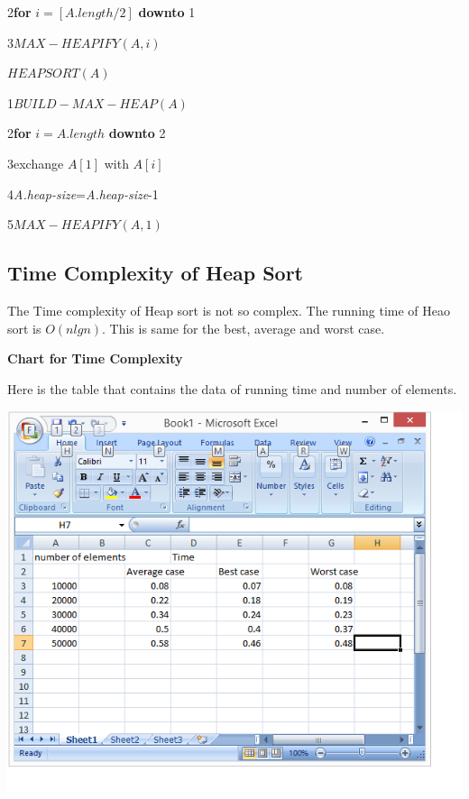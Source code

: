 \documentclass[12 pt,a4paper]{report}
\begin{document}
2\hspace{0.5cm}\textbf{for} $i=[A.length/2]$ \textbf{downto} 1

3\hspace{1cm}$MAX-HEAPIFY(A,i)$

\vspace{1cm}

$HEAPSORT(A)$

1\hspace{0.5cm}$BUILD-MAX-HEAP(A)$

2\hspace{0.5cm}\textbf{for} $i=A.length$ \textbf{downto} 2

3\hspace{1cm}exchange $A[1]$ with $A[i]$

4\hspace{1cm}\textit{A.heap-size}=\textit{A.heap-size}-1

5\hspace{1cm}$MAX-HEAPIFY(A,1)$

\subsection{Time Complexity of Heap Sort}

The Time complexity of Heap sort is not so complex. The running time of Heao sort is $O(nlgn)$. This is same for the best, average and worst case.

\textbf{Chart for Time Complexity}

Here is the table that contains the data of running time and number of elements.

\vspace{1cm}


\includegraphics{heapdata.png}
\end{document}

